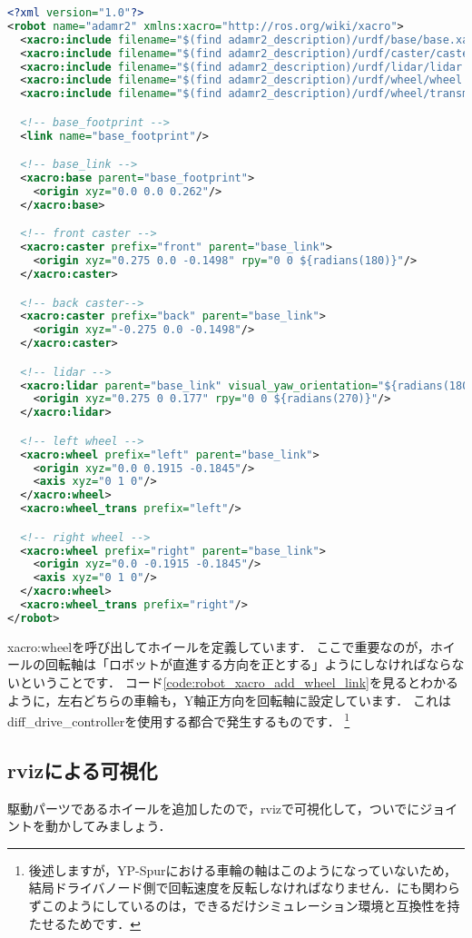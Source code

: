 \documentclass[{../../master}]{subfiles}
\begin{document}
\begin{lstlisting}[language=XML, label=code:robot_xacro_add_wheel_link, caption=Add \textsf{wheel\_link} to Robot Model]
<?xml version="1.0"?>
<robot name="adamr2" xmlns:xacro="http://ros.org/wiki/xacro">
  <xacro:include filename="$(find adamr2_description)/urdf/base/base.xacro"/>
  <xacro:include filename="$(find adamr2_description)/urdf/caster/caster.xacro"/>
  <xacro:include filename="$(find adamr2_description)/urdf/lidar/lidar.xacro"/>
  <xacro:include filename="$(find adamr2_description)/urdf/wheel/wheel.xacro"/>
  <xacro:include filename="$(find adamr2_description)/urdf/wheel/transmission.xacro"/>

  <!-- base_footprint -->
  <link name="base_footprint"/>

  <!-- base_link -->
  <xacro:base parent="base_footprint">
    <origin xyz="0.0 0.0 0.262"/>
  </xacro:base>

  <!-- front caster -->
  <xacro:caster prefix="front" parent="base_link">
    <origin xyz="0.275 0.0 -0.1498" rpy="0 0 ${radians(180)}"/>
  </xacro:caster>

  <!-- back caster-->
  <xacro:caster prefix="back" parent="base_link">
    <origin xyz="-0.275 0.0 -0.1498"/>
  </xacro:caster>

  <!-- lidar -->
  <xacro:lidar parent="base_link" visual_yaw_orientation="${radians(180)}">
    <origin xyz="0.275 0 0.177" rpy="0 0 ${radians(270)}"/>
  </xacro:lidar>

  <!-- left wheel -->
  <xacro:wheel prefix="left" parent="base_link">
    <origin xyz="0.0 0.1915 -0.1845"/>
    <axis xyz="0 1 0"/>
  </xacro:wheel>
  <xacro:wheel_trans prefix="left"/>

  <!-- right wheel -->
  <xacro:wheel prefix="right" parent="base_link">
    <origin xyz="0.0 -0.1915 -0.1845"/>
    <axis xyz="0 1 0"/>
  </xacro:wheel>
  <xacro:wheel_trans prefix="right"/>
</robot>
\end{lstlisting}

\textsf{xacro:wheel}を呼び出してホイールを定義しています．
ここで重要なのが，ホイールの回転軸は「ロボットが直進する方向を正とする」ようにしなければならないということです．
コード\ref{code:robot_xacro_add_wheel_link}を見るとわかるように，左右どちらの車輪も，Y軸正方向を回転軸に設定しています．
これは\textsf{diff\_drive\_controller}を使用する都合で発生するものです．
\footnote{後述しますが，YP-Spurにおける車輪の軸はこのようになっていないため，結局ドライバノード側で回転速度を反転しなければなりません．にも関わらずこのようにしているのは，できるだけシミュレーション環境と互換性を持たせるためです．}

\subsection{\textsf{rviz}による可視化}

駆動パーツであるホイールを追加したので，\textsf{rviz}で可視化して，ついでにジョイントを動かしてみましょう．
\end{document}
